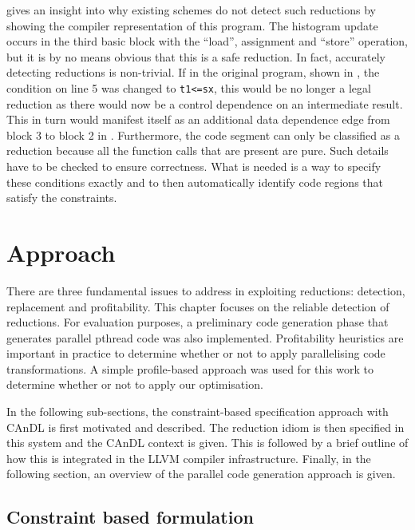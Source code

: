      gives an insight into why existing schemes do not
    detect such reductions by showing the compiler representation of this 
    program.
    The histogram update occurs in the third basic block with the ``load'',
    assignment and ``store'' operation, but it is by no means obvious that this
    is a safe reduction.
    In fact, accurately detecting reductions is non-trivial.
    If in the original program, shown in , the
    condition on line 5 was changed to {\tt t1<=sx}, this would be no longer a
    legal reduction as there would now be a control dependence on an
    intermediate result.
    This in turn would manifest itself as an additional data dependence edge
    from block 3 to block 2 in .
    Furthermore, the code segment can only be classified as a reduction because
    all the function calls that are present are pure.
    Such details have to be checked to ensure correctness.
    What is needed is a way to specify these conditions exactly and to then
    automatically identify code regions that satisfy the constraints.

\section{Approach}

    There are three fundamental issues to address in exploiting reductions:
    detection, replacement and profitability.
    This chapter focuses on the reliable detection of reductions.
    For evaluation purposes, a preliminary code generation phase that generates
    parallel pthread code was also implemented.
    Profitability heuristics are important in practice to determine whether or
    not to apply parallelising code transformations.
    A simple profile-based approach was used for this work to determine whether
    or not to apply our optimisation.

    In the following sub-sections, the constraint-based specification approach
    with CAnDL is first motivated and described.
    The reduction idiom is then specified in this system and the CAnDL context
    is given.
    This is followed by a brief outline of how this is integrated in the
    LLVM compiler infrastructure.
    Finally, in the following section, an overview of the parallel code
    generation approach is given.

\subsection{Constraint based formulation}

